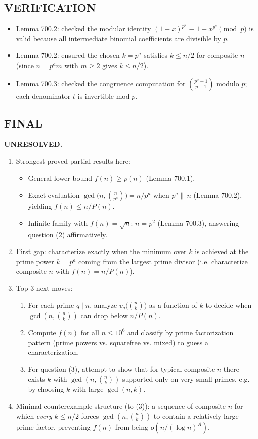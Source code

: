 \subsection*{VERIFICATION}
\begin{itemize}
\item Lemma 700.2: checked the modular identity $(1+x)^{p^a}\equiv 1+x^{p^a}\pmod p$ is valid because all intermediate binomial coefficients are divisible by $p$.
\item Lemma 700.2: ensured the chosen $k=p^a$ satisfies $k\le n/2$ for composite $n$ (since $n=p^a m$ with $m\ge 2$ gives $k\le n/2$).
\item Lemma 700.3: checked the congruence computation for $\binom{p^2-1}{p-1}$ modulo $p$; each denominator $t$ is invertible mod $p$.
\end{itemize}

\subsection*{FINAL}
\textbf{UNRESOLVED.}
\begin{enumerate}
\item[(i)] Strongest proved partial results here:
  \begin{itemize}
  \item General lower bound $f(n)\ge p(n)$ (Lemma 700.1).
  \item Exact evaluation $\gcd\bigl(n,\binom{n}{p^a}\bigr)=n/p^a$ when $p^a\|\,n$ (Lemma 700.2), yielding $f(n)\le n/P(n)$.
  \item Infinite family with $f(n)=\sqrt{n}$: $n=p^2$ (Lemma 700.3), answering question (2) affirmatively.
  \end{itemize}
\item[(ii)] First gap: characterize exactly when the minimum over $k$ is achieved at the prime power $k=p^a$ coming from the largest prime divisor (i.e. characterize composite $n$ with $f(n)=n/P(n)$).
\item[(iii)] Top 3 next moves:
  \begin{enumerate}
  \item For each prime $q\mid n$, analyze $v_q\bigl(\binom{n}{k}\bigr)$ as a function of $k$ to decide when $\gcd(n,\binom{n}{k})$ can drop below $n/P(n)$.
  \item Compute $f(n)$ for all $n\le 10^6$ and classify by prime factorization pattern (prime powers vs. squarefree vs. mixed) to guess a characterization.
  \item For question (3), attempt to show that for typical composite $n$ there exists $k$ with $\gcd(n,\binom{n}{k})$ supported only on very small primes, e.g. by choosing $k$ with large $\gcd(n,k)$.
  \end{enumerate}
\item[(iv)] Minimal counterexample structure (to (3)): a sequence of composite $n$ for which \emph{every} $k\le n/2$ forces $\gcd(n,\binom{n}{k})$ to contain a relatively large prime factor, preventing $f(n)$ from being $o(n/(\log n)^A)$.
\end{enumerate}



